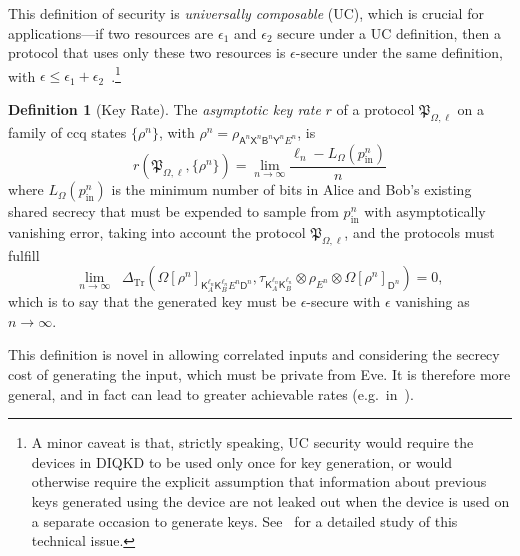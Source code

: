 \documentclass[10pt, a4paper]{article}
\numberwithin{equation}{section} %
\newcounter{stmt} %
\theoremstyle{definition}
\newtheorem{defn}[stmt]{Definition}
\theoremstyle{plain}
\newcommand{\?}{\mathrel{?}} %
\newcommand{\Trdist}[2]{\mathop{}\Delta_\mathrm{Tr}\left(#1, #2\right)}
\newcommand{\crv}[1]{\mathsf{#1}}
\newcommand{\proto}[2][_{\Omega,\ell}]{\mathfrak{#2}#1}
\newcommand{\prin}[1][p]{#1_{\mathrm{in}}}
\begin{document}
    This definition of security is \emph{universally composable} (UC), which is crucial for applications---if two resources are \(\epsilon_1\) and \(\epsilon_2\) secure under a UC definition, then a protocol that uses only these two resources is \(\epsilon\)-secure under the same definition, with \(\epsilon \leq \epsilon_1 + \epsilon_2\)~\cite{SecurityQKD}.\footnote{A minor caveat is that, strictly speaking, UC security would require the devices in DIQKD to be used only once for key generation, or would otherwise require the explicit assumption that information about previous keys generated using the device are not leaked out when the device is used on a separate occasion to generate keys. See~\cite{SecurityQKD} for a detailed study of this technical issue.}

    \begin{defn}[Key Rate]
      The \emph{asymptotic key rate} \(r\) of a protocol \(\proto{P}\) on a family of ccq states \({\{\rho^{n}\}}\), with \(\rho^{n} = \rho_{\crv{A}^n\crv{X}^n \crv{B}^n\crv{Y}^n E^n}\), is
    \begin{equation}
      r(\proto{P}, \{\rho^n\}) = \lim_{n\to\infty} \frac{\ell_n - L_{\Omega}(\prin^n)}{n}
    \end{equation}
    where \(L_{\Omega}(\prin^n)\) is the minimum number of bits in Alice and Bob's existing shared secrecy that must be expended to sample from \(\prin^n\) with asymptotically vanishing error, taking into account the protocol \(\proto{P}\), and the protocols must fulfill
    \begin{equation}
    \lim_{n\to\infty} \Trdist{{\Omega[\rho^n]}_{\crv{K}_{A}^{\ell_n} \crv{K}_{B}^{\ell_n} E^n \crv{D}^n}}{\tau_{\crv{K}_{A}^{\ell_n} \crv{K}_{B}^{\ell_n}} \otimes \rho_{E^n} \otimes {\Omega[\rho^n]}_{\crv{D}^n}} = 0,
    \end{equation}
    which is to say that the generated key must be \(\epsilon\)-secure with \(\epsilon\) vanishing as \(n\to\infty\).
  \end{defn}

    This definition is novel in allowing correlated inputs and considering the secrecy cost of generating the input, which must be private from Eve. It is therefore more general, and in fact can lead to greater achievable rates (e.g.\ in~\cite[Prot. 2]{DIQKD_FiniteSize}).
\end{document}
